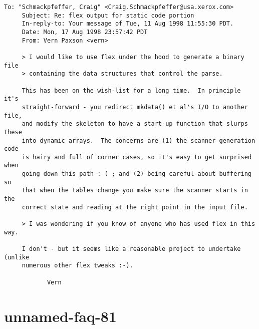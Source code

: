 \documentclass[openany,oneside]{book}
\begin{document}
\begin{verbatim}
To: "Schmackpfeffer, Craig" <Craig.Schmackpfeffer@usa.xerox.com>
     Subject: Re: flex output for static code portion
     In-reply-to: Your message of Tue, 11 Aug 1998 11:55:30 PDT.
     Date: Mon, 17 Aug 1998 23:57:42 PDT
     From: Vern Paxson <vern>
     
     > I would like to use flex under the hood to generate a binary file
     > containing the data structures that control the parse.
     
     This has been on the wish-list for a long time.  In principle it's
     straight-forward - you redirect mkdata() et al's I/O to another file,
     and modify the skeleton to have a start-up function that slurps these
     into dynamic arrays.  The concerns are (1) the scanner generation code
     is hairy and full of corner cases, so it's easy to get surprised when
     going down this path :-( ; and (2) being careful about buffering so
     that when the tables change you make sure the scanner starts in the
     correct state and reading at the right point in the input file.
     
     > I was wondering if you know of anyone who has used flex in this way.
     
     I don't - but it seems like a reasonable project to undertake (unlike
     numerous other flex tweaks :-).
     
     		Vern
\end{verbatim}

\section{unnamed-faq-81}
\end{document}

